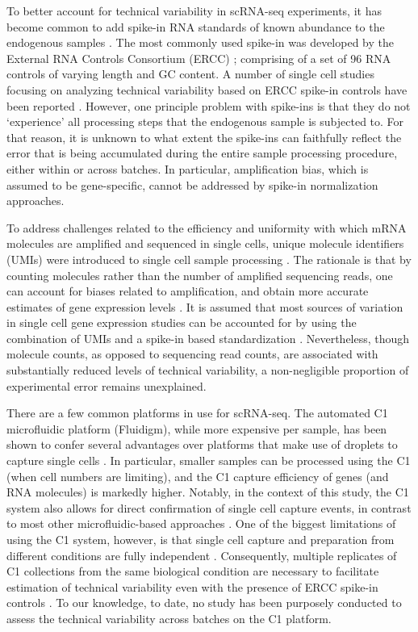 To better account for technical variability in scRNA-seq experiments, it
has become common to add spike-in RNA standards of known abundance to
the endogenous samples \citep{Brennecke2013, Grun2014}. The most
commonly used spike-in was developed by the External RNA Controls
Consortium (ERCC) \citep{Jiang2011}; comprising of a set of 96 RNA
controls of varying length and GC content. A number of single cell
studies focusing on analyzing technical variability based on ERCC
spike-in controls have been reported \citep{Brennecke2013, Grun2014,
Ding2015, Vallejos2015}. However, one principle problem with
spike-ins is that they do not `experience' all processing steps that the
endogenous sample is subjected to. For that reason, it is unknown to
what extent the spike-ins can faithfully reflect the error that is being
accumulated during the entire sample processing procedure, either within
or across batches. In particular, amplification bias, which is assumed
to be gene-specific, cannot be addressed by spike-in normalization
approaches.

To address challenges related to the efficiency and uniformity with
which mRNA molecules are amplified and sequenced in single cells, unique
molecule identifiers (UMIs) were introduced to single cell sample
processing \citep{Kivioja2011, Fu2011, Casbon2011, Shiroguchi2012}.
The rationale is that by counting molecules rather than the number of
amplified sequencing reads, one can account for biases related to
amplification, and obtain more accurate estimates of gene expression
levels \citep{Jaitin2014, Islam2014, Grun2014}. It is assumed that most
sources of variation in single cell gene expression studies can be
accounted for by using the combination of UMIs and a spike-in based
standardization \citep{Islam2014, Vallejos2015}. Nevertheless, though
molecule counts, as opposed to sequencing read counts, are associated
with substantially reduced levels of technical variability, a
non-negligible proportion of experimental error remains unexplained.

There are a few common platforms in use for scRNA-seq. The automated C1
microfluidic platform (Fluidigm), while more expensive per sample, has
been shown to confer several advantages over platforms that make use of
droplets to capture single cells \citep{Wu2014, Macosko2015}. In
particular, smaller samples can be processed using the C1 (when cell
numbers are limiting), and the C1 capture efficiency of genes (and RNA
molecules) is markedly higher. Notably, in the context of this study,
the C1 system also allows for direct confirmation of single cell capture
events, in contrast to most other microfluidic-based approaches
\citep{Macosko2015, Klein2015}. One of the biggest limitations of using
the C1 system, however, is that single cell capture and preparation from
different conditions are fully independent \citep{Hicks2015}.
Consequently, multiple replicates of C1 collections from the same
biological condition are necessary to facilitate estimation of technical
variability even with the presence of ERCC spike-in controls
\citep{Stegle2015}. To our knowledge, to date, no study has been
purposely conducted to assess the technical variability across batches
on the C1 platform.

